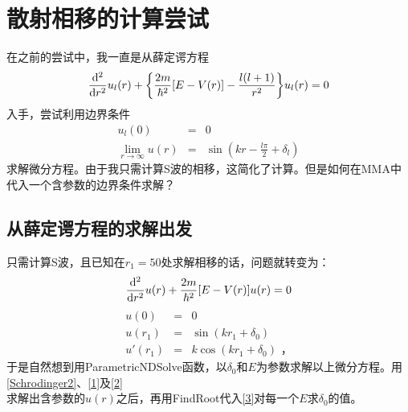 \documentclass[hyperref,cs4size,titlepage,twoside]{ctexart}
\begin{document}
\section{散射相移的计算尝试}
在之前的尝试中，我一直是从薛定谔方程
\begin{equation}\label{Schrodinger}
\dv[2]{r}u_l(r)+\Bqty{\frac{2m}{\hbar^2}\bqty{E-V(r)}-\frac{l(l+1)}{r^2}}u_l(r)=0
\end{equation}
入手，尝试利用边界条件
\begin{eqnarray}
  u_l(0) &=& 0 \\
  \lim_{r\to\infty}u(r) &=& \sin(kr-\frac{l\pi}{2}+\delta_l)
\end{eqnarray}
求解微分方程。由于我只需计算S波的相移，这简化了计算。但是如何在MMA中代入一个含参数的边界条件求解？
\subsection{从薛定谔方程的求解出发}
只需计算S波，且已知在$r_1=50$处求解相移的话，问题就转变为：
\begin{equation}\label{Schrodinger2}
\dv[2]{r}u(r)+\frac{2m}{\hbar^2}\bqty{E-V(r)}u(r)=0
\end{equation}
\begin{eqnarray}
  \label{1}u(0) &=& 0 \\
  u(r_1) &=& \sin(kr_1+\delta_0)\label{2}
  \\  u'(r_1) &=& k\cos(kr_1+\delta_0)\label{3}
\text{  ，}
\end{eqnarray}
于是自然想到用ParametricNDSolve函数，以$\delta_0$和$E$为参数求解以上微分方程。用\eqref{Schrodinger2}、\eqref{1}及\eqref{2}\\求解出含参数的$u(r)$之后，再用FindRoot代入\eqref{3}对每一个$E$求$\delta_0$的值。
\end{document}
